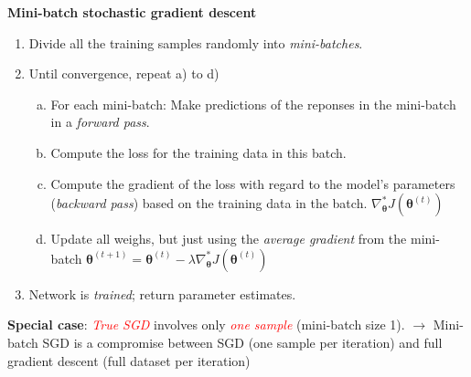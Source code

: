 \documentclass[10pt,ignorenonframetext,]{beamer}
\providecommand{\tightlist}{%
  \setlength{\itemsep}{0pt}\setlength{\parskip}{0pt}}
\begin{document}
\begin{frame}

\textbf{Mini-batch stochastic gradient descent}

\vspace{1mm}

\begin{enumerate}
\tightlist
\item
  Divide all the training samples randomly into \emph{mini-batches}.
\end{enumerate}

\vspace{1mm}

\begin{enumerate}
\setcounter{enumi}{1}
\tightlist
\item
  Until convergence, repeat a) to d)

  \begin{enumerate}
  [a)]
  \tightlist
  \item
    For each mini-batch: Make predictions of the reponses in the
    mini-batch in a \emph{forward pass}.
  \item
    Compute the loss for the training data in this batch.
  \item
    Compute the gradient of the loss with regard to the model's
    parameters (\emph{backward pass}) based on the training data in the
    batch.
    \(\nabla_{\boldsymbol \theta}^* J({\boldsymbol \theta}^{(t)})\)
  \item
    Update all weighs, but just using the \emph{average gradient} from
    the mini-batch
    \({\boldsymbol \theta}^{(t+1)}={\boldsymbol \theta}^{(t)} - \lambda \nabla_{\boldsymbol \theta} ^* J({\boldsymbol \theta}^{(t)})\)
  \end{enumerate}
\end{enumerate}

\vspace{1mm}

\begin{enumerate}
\setcounter{enumi}{2}
\tightlist
\item
  Network is \emph{trained}; return parameter estimates.
\end{enumerate}

\vspace{6mm}

\textbf{Special case}: \emph{\textcolor{red}{True SGD}} involves only
\emph{\textcolor{red}{one sample}} (mini-batch size 1). \(\rightarrow\)
Mini-batch SGD is a compromise between SGD (one sample per iteration)
and full gradient descent (full dataset per iteration)

\end{frame}
\end{document}
